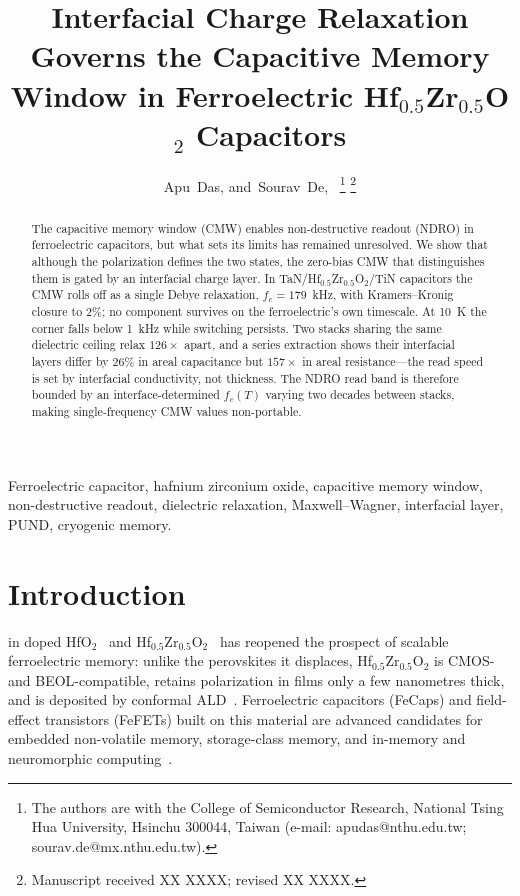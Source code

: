 \documentclass[journal]{IEEEtran}
\newcommand{\hzo}{Hf$_{0.5}$Zr$_{0.5}$O$_{2}$}
\newcommand{\fc}{f_{c}}
\begin{document}
\title{Interfacial Charge Relaxation Governs the Capacitive Memory Window
in Ferroelectric \hzo{} Capacitors}

\author{Apu~Das,
        and~Sourav~De,~
\thanks{The authors are with the College of Semiconductor Research,
National Tsing Hua University, Hsinchu 300044, Taiwan
(e-mail: apudas@nthu.edu.tw; sourav.de@mx.nthu.edu.tw).}
\thanks{Manuscript received XX XXXX; revised XX XXXX.}}



\maketitle

\begin{abstract}
The capacitive memory window (CMW) enables non-destructive readout (NDRO)
in ferroelectric capacitors, but what sets its limits has remained
unresolved. We show that although the polarization defines the two states,
the zero-bias CMW that distinguishes them is gated by an interfacial charge
layer. In TaN/\hzo{}/TiN capacitors the CMW rolls off as a single Debye
relaxation, $\fc = 179$~kHz, with Kramers--Kronig closure to 2\%; no
component survives on the ferroelectric's own timescale. At 10~K the corner
falls below 1~kHz while switching persists. Two stacks sharing the same
dielectric ceiling relax $126\times$ apart, and a series extraction shows
their interfacial layers differ by 26\% in areal capacitance but
$157\times$ in areal resistance---the read speed is set by interfacial
conductivity, not thickness. The NDRO read band is therefore bounded by an
interface-determined $\fc(T)$ varying two decades between stacks, making
single-frequency CMW values non-portable.
\end{abstract}

\begin{IEEEkeywords}
Ferroelectric capacitor, hafnium zirconium oxide, capacitive memory window,
non-destructive readout, dielectric relaxation, Maxwell--Wagner, interfacial
layer, PUND, cryogenic memory.
\end{IEEEkeywords}

\IEEEpeerreviewmaketitle

\section{Introduction}
 in doped HfO$_2$~\cite{boscke2011} and
\hzo{}~\cite{muller2012} has reopened the prospect of scalable ferroelectric
memory: unlike the perovskites it displaces, \hzo{} is CMOS- and
BEOL-compatible, retains polarization in films only a few nanometres thick,
and is deposited by conformal ALD~\cite{cho2024beol,schroeder2022}.
Ferroelectric capacitors (FeCaps) and field-effect transistors (FeFETs) built
on this material are advanced candidates for embedded non-volatile memory,
storage-class memory, and in-memory and neuromorphic
computing~\cite{paul2025review,sunil2024cam,das2026cryo,sk2025stdp}.
\end{document}
